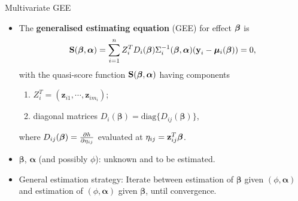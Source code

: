 \documentclass{beamer}
\newcommand{\boldbeta}{{\boldsymbol \beta}}
\newcommand{\boldalpha}{{\boldsymbol \alpha}}
\newcommand{\boldmu}{{\boldsymbol \mu}}
\newenvironment{wideitemize}%
  {\begin{itemize}%
    \setlength{\parskip}{1em}}%
  {\end{itemize}}
\begin{document}
\begin{frame}{Multivariate GEE}
\begin{wideitemize}
%
\item

The  \textbf{generalised estimating equation} (GEE) for effect $\mbox{\boldmath $\beta$}$ is
\begin{equation}
{\bf S}(\boldbeta,\boldalpha)
=\sum_{i=1}^n Z_i^TD_i(\boldbeta) \Sigma_i^{-1}(\boldbeta,
\boldalpha)(\textbf{y}_i-\boldmu_i(\boldbeta))= 0,
\label{eq-3.5.11}
\end{equation}
with  the quasi-score function ${\bf S}(\boldbeta,\boldalpha)$ having components
\begin{enumerate}
\item $Z_i^T=(\textbf{z}_{i1},\cdots,\textbf{z}_{im_i})$;  
\item diagonal matrices
$D_i(\boldbeta)=\mbox{diag}\{D_{ij}(\boldbeta)\}$, 
\end{enumerate}
where 
$D_{ij}(\mbox{\boldmath $\beta$})=\frac{\partial h}{\partial \eta_{ij}}$ evaluated at
$\eta_{ij}=\textbf{z}_{ij}^T\mbox{\boldmath $\beta$}$. 




\item 

 $\boldbeta$, $\boldalpha$ (and possibly $\phi$): unknown and  to be estimated. 

\item General estimation strategy: Iterate between estimation of  $\boldbeta$ given $(\phi, \boldalpha)$ and estimation of  $(\phi, \boldalpha)$  given $\boldbeta$, until convergence. 

\end{wideitemize}
\end{frame}
\end{document}
